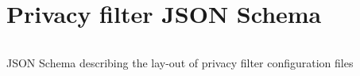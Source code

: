 \section{Privacy filter JSON Schema}
\label{appendix:privacy-filter-jsonschema}

\begin{code}
\inputminted[linenos,tabsize=2,breaklines]{json}{code/privacy-filter-json-schema.json}
\caption{JSON Schema describing the lay-out of privacy filter configuration files}
\label{listing:privacy-filter-jsonschema}
\end{code}